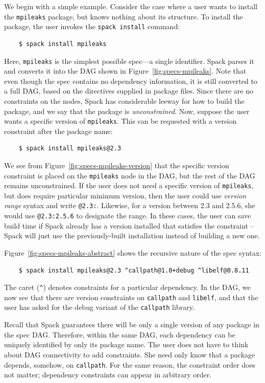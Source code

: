 We begin with a simple example.
Consider the case where a user wants to install the {\tt mpileaks} package, but knows
nothing about its structure.  To install the package, the user invokes the {\tt spack install}
command:
%
\begin{verbatim}
    $ spack install mpileaks
\end{verbatim}
%
Here, {\tt mpileaks} is the simplest possible spec---a single identifier.
Spack parses it and converts it into the DAG shown in Figure~\ref{fig:specs-mpileaks}.
Note that even though the spec contains no dependency information, it is still
converted to a full DAG, based on the directives supplied in package files. Since there
are no constraints on the nodes, Spack has considerable leeway for how to build the package,
and we say that the package is {\it unconstrained}.
%
Now, suppose the user wants a specific version of {\tt mpileaks}.  This can be requested
with a version constraint after the package name:
%
\begin{verbatim}
    $ spack install mpileaks@2.3
\end{verbatim}
%
We see from Figure~\ref{fig:specs-mpileaks-version} that the specific version constraint is
placed on the {\tt mpileaks} node in the DAG, but the rest of the DAG remains unconstrained.
If the user does not need a specific version of {\tt mpileaks}, but does require
particular minimum version, then the user could use {\it version range} syntax
and write {\tt @2.3:}.  Likewise, for a version between 2.3 and 2.5.6, she would use
{\tt @2.3:2.5.6} to designate the range. In these cases, the user can save build time if
Spack already has a version installed that satisfies the constraint -- Spack will just use
the previously-built installation instead of building a new one.

Figure~\ref{fig:specs-mpileaks-abstract} shows the recursive nature of the spec syntax:
%
\begin{verbatim}
    $ spack install mpileaks@2.3 ^callpath@1.0+debug ^libelf@0.8.11
\end{verbatim}
%
The caret (\verb|^|) denotes constraints for a particular dependency.  In the DAG,
we now see that there are version constraints on {\tt callpath} and {\tt libelf},
and that the user has asked for the debug variant of the {\tt callpath} library.

Recall that Spack guarantees there will be only a single version of any package in
the spec DAG.  Therefore, within the same DAG, each dependency can be uniquely identified by
only its package name.  The user does not have to think about DAG connectivity to add
constraints.  She need only know that a package depends, somehow, on {\tt callpath}.
For the same reason, the constraint order does not matter; dependency constraints
can appear in arbitrary order.

